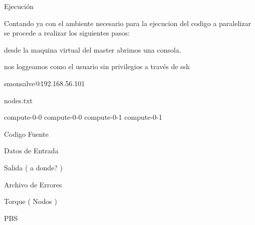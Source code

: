 Ejecución

Contando ya con el ambiente necesario para la ejecucion del codigo a paralelizar se procede a realizar los siguientes pasos: 


desde la maquina virtual del master abrimos una consola. 

nos loggeamos como el usuario sin privilegios a través de ssh

smonsalve@192.168.56.101








nodes.txt


compute-0-0
compute-0-0
compute-0-1
compute-0-1




Codigo Fuente

Datos de Entrada

Salida ( a donde? )

Archivo de Errores

Torque  ( Nodos  )

PBS
 